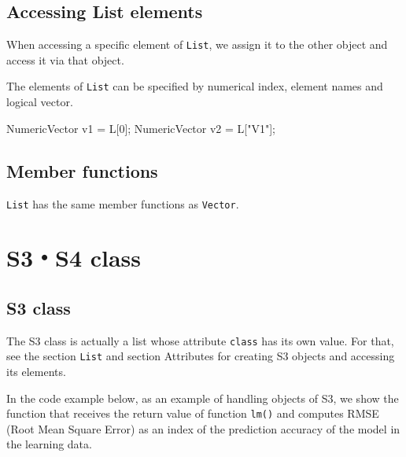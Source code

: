 \documentclass[]{book}
\newenvironment{Shaded}{\begin{snugshade}}{\end{snugshade}}
\newcommand{\DecValTok}[1]{\textcolor[rgb]{0.00,0.00,0.81}{#1}}
\newcommand{\StringTok}[1]{\textcolor[rgb]{0.31,0.60,0.02}{#1}}
\newcommand{\NormalTok}[1]{#1}
\theoremstyle{definition}
\theoremstyle{definition}
\theoremstyle{remark}
\begin{document}
\section{Accessing List elements}\label{accessing-list-elements}

When accessing a specific element of \texttt{List}, we assign it to the
other object and access it via that object.

The elements of \texttt{List} can be specified by numerical index,
element names and logical vector.

\begin{Shaded}
\begin{Highlighting}[]
\NormalTok{NumericVector v1 = L[}\DecValTok{0}\NormalTok{];}
\NormalTok{NumericVector v2 = L[}\StringTok{"V1"}\NormalTok{];}
\end{Highlighting}
\end{Shaded}

\section{Member functions}\label{member-functions-3}

\texttt{List} has the same member functions as \texttt{Vector}.

\chapter{S3・S4 class}\label{s3s4-class}

\section{S3 class}\label{s3-class}

The S3 class is actually a list whose attribute \texttt{class} has its
own value. For that, see the section \texttt{List} and section
Attributes for creating S3 objects and accessing its elements.

In the code example below, as an example of handling objects of S3, we
show the function that receives the return value of function
\texttt{lm()} and computes RMSE (Root Mean Square Error) as an index of
the prediction accuracy of the model in the learning data.
\end{document}
